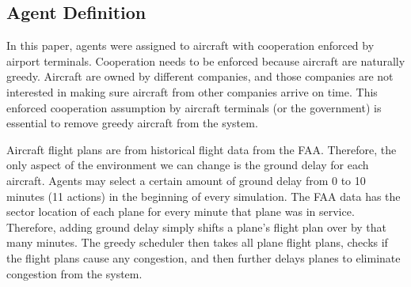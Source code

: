 \documentclass{aamas2014}
\begin{document}

\subsection{Agent Definition}
In this paper, agents were assigned to aircraft with cooperation enforced by airport terminals. Cooperation needs to be enforced because aircraft are naturally greedy. Aircraft are owned by different companies, and those companies are not interested in making sure aircraft from other companies arrive on time. This enforced cooperation assumption by aircraft terminals (or the government) is essential to remove greedy aircraft from the system.

Aircraft flight plans are from historical flight data from the FAA. Therefore, the only aspect of the environment we can change is the ground delay for each aircraft. Agents may select a certain amount of ground delay from 0 to 10 minutes (11 actions) in the beginning of every simulation. The FAA data has the sector location of each plane for every minute that plane was in service. Therefore, adding ground delay simply shifts a plane's flight plan over by that many minutes. The greedy scheduler then takes all plane flight plans, checks if the flight plans cause any congestion, and then further delays planes to eliminate congestion from the system.

\end{document}
